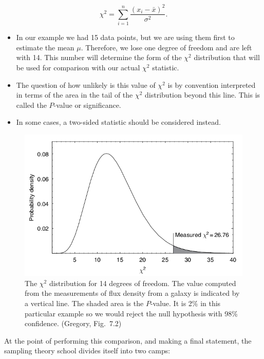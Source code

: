 \documentclass[%
oneside,                 %
final,                   %
10pt]{article}
\begin{document}
\noindent
\[
\chi^2 = \sum_{i=1}^n \frac{(x_i - \bar{x})^2}{\sigma^2}.
\]

\begin{itemize}
\item In our example we had 15 data points, but we are using them first to estimate the mean $\mu$. Therefore, we lose one degree of freedom and are left with 14. This number will determine the form of the $\chi^2$ distribution that will be used for comparison with our actual $\chi^2$ statistic.

\item The question of how unlikely is this value of $\chi^2$ is by convention interpreted in terms of the area in the tail of the $\chi^2$ distribution beyond this line. This is called the $P$-value or significance. 

\item In some cases, a two-sided statistic should be considered instead. 
\end{itemize}

\noindent

\begin{figure}[!ht]  %
  \centerline{\includegraphics[width=0.8\linewidth]{fig/gregory_7_2.png}}
  \caption{
  The $\chi^2$ distribution for 14 degrees of freedom. The value computed from the measurements of flux density from a galaxy is indicated by a vertical line. The shaded area is the $P$-value. It is 2\% in this particular example so we would reject the null hypothesis with 98\% confidence. (Gregory, Fig.~7.2)
  }
\end{figure}



At the point of performing this comparison, and making a final statement, the sampling theory school divides itself into two camps:
\end{document}
